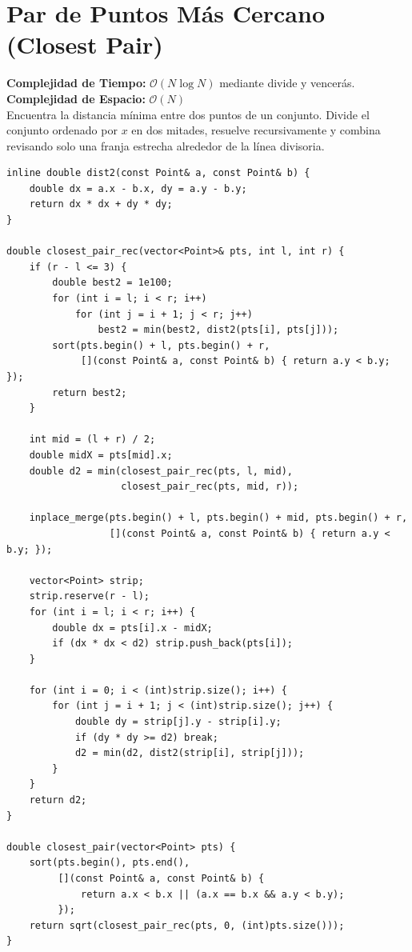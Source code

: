 \documentclass[10pt,twocolumn,letterpaper]{report}
\begin{document}
\section{Par de Puntos Más Cercano (Closest Pair)}
\textbf{Complejidad de Tiempo:} $\mathcal{O}(N \log N)$ mediante divide y vencerás. \\
\textbf{Complejidad de Espacio:} $\mathcal{O}(N)$ \\
Encuentra la distancia mínima entre dos puntos de un conjunto. Divide el conjunto ordenado por $x$ en dos mitades, resuelve recursivamente y combina revisando solo una franja estrecha alrededor de la línea divisoria.
\begin{lstlisting}
inline double dist2(const Point& a, const Point& b) {
    double dx = a.x - b.x, dy = a.y - b.y;
    return dx * dx + dy * dy;
}

double closest_pair_rec(vector<Point>& pts, int l, int r) {
    if (r - l <= 3) {
        double best2 = 1e100;
        for (int i = l; i < r; i++)
            for (int j = i + 1; j < r; j++)
                best2 = min(best2, dist2(pts[i], pts[j]));
        sort(pts.begin() + l, pts.begin() + r,
             [](const Point& a, const Point& b) { return a.y < b.y; });
        return best2;
    }

    int mid = (l + r) / 2;
    double midX = pts[mid].x;
    double d2 = min(closest_pair_rec(pts, l, mid),
                    closest_pair_rec(pts, mid, r));

    inplace_merge(pts.begin() + l, pts.begin() + mid, pts.begin() + r,
                  [](const Point& a, const Point& b) { return a.y < b.y; });

    vector<Point> strip;
    strip.reserve(r - l);
    for (int i = l; i < r; i++) {
        double dx = pts[i].x - midX;
        if (dx * dx < d2) strip.push_back(pts[i]);
    }

    for (int i = 0; i < (int)strip.size(); i++) {
        for (int j = i + 1; j < (int)strip.size(); j++) {
            double dy = strip[j].y - strip[i].y;
            if (dy * dy >= d2) break;
            d2 = min(d2, dist2(strip[i], strip[j]));
        }
    }
    return d2;
}

double closest_pair(vector<Point> pts) {
    sort(pts.begin(), pts.end(),
         [](const Point& a, const Point& b) {
             return a.x < b.x || (a.x == b.x && a.y < b.y);
         });
    return sqrt(closest_pair_rec(pts, 0, (int)pts.size()));
}
\end{lstlisting}
\end{document}

